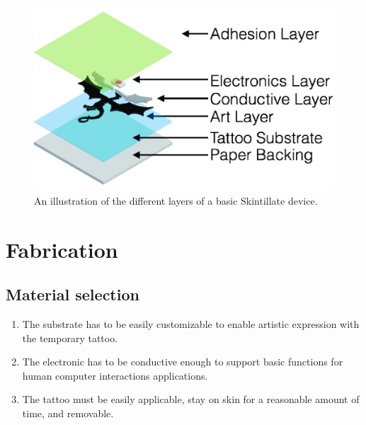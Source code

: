 \documentclass{sigchi}
\begin{document}
\begin{figure}
\centering
\includegraphics[width=0.9\columnwidth]{figures/Figure4}
\caption{An illustration of the different layers of a basic Skintillate device.}
\vspace{-8pt}
\label{fig:layers}
\end{figure}
 

\section{Fabrication}
\subsection{Material selection}
\begin{enumerate}
  \item The substrate has to be easily customizable to enable artistic expression with the temporary tattoo.
  \item The electronic has to be conductive enough to support basic functions for human computer interactions applications. 
  \item The tattoo must be easily applicable, stay on skin for a reasonable amount of time, and removable.
\end{enumerate}
\end{document}
